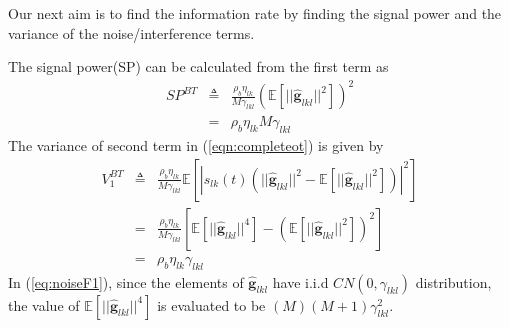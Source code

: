 \documentclass[10pt, a4paper, twoside,fleqn]{article}
\begin{document}
Our next aim is to find the information rate by finding the signal power and the variance of the noise/interference terms. 

The signal power(SP) can be calculated from the first term as
\begin{eqnarray}
	SP^{BT} &\triangleq&  \frac{\rho_b\eta_{lk}}{M\gamma_{lkl}}(\mathbb{E}[||\pmb{\hat g}_{lkl}||^2])^2 \nonumber \\
            &=& \rho_b\eta_{lk}M\gamma_{lkl}
\end{eqnarray}
The variance of second term in (\ref{eqn:completeot}) is given by
\begin{eqnarray}\label{eq:noiseF1}
	V_1^{BT} &\triangleq& \frac{\rho_b \eta_{lk}}{M\gamma_{lkl}}   \mathbb{E}[|s_{lk}(t)\left(||\pmb{\hat g}_{lkl}||^2- \mathbb{E}[||\pmb{\hat  g}_{lkl}||^2] \right)|^2] \nonumber \\
	    &=& \frac{\rho_b \eta_{lk}}{M\gamma_{lkl}}\left[\mathbb{E}[||\pmb{\hat g}_{lkl}||^4] - (\mathbb{E}[||\pmb{\hat g}_{lkl}||^2])^2 \right] \nonumber  \\
	    &=& \rho_b\eta_{lk}\gamma_{lkl}
\end{eqnarray}
In (\ref{eq:noiseF1}), since the elements of $\pmb{\hat g}_{lkl}$ have i.i.d  $CN(0,\gamma_{lkl})$ distribution, the value of $\mathbb{E}[||\pmb{\hat g}_{lkl}||^4]$ is evaluated to be $(M)(M+1)\gamma_{lkl}^2$.
\end{document}
